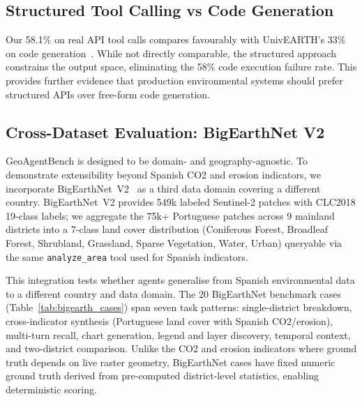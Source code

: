 \documentclass[10pt,twocolumn]{article}
\begin{document}
\subsection{Structured Tool Calling vs Code Generation}

Our 58.1\% on real API tool calls compares favourably with UnivEARTH's 33\% on code generation~\cite{kao2025univearth}. While not directly comparable, the structured approach constrains the output space, eliminating the 58\% code execution failure rate. This provides further evidence that production environmental systems should prefer structured APIs over free-form code generation.

\subsection{Cross-Dataset Evaluation: BigEarthNet V2}
\label{sec:validation}

GeoAgentBench is designed to be domain- and geography-agnostic. To demonstrate extensibility beyond Spanish CO2 and erosion indicators, we incorporate BigEarthNet~V2~\cite{clasen2024reben} as a third data domain covering a different country. BigEarthNet~V2 provides 549k labeled Sentinel-2 patches with CLC2018 19-class labels; we aggregate the 75k+ Portuguese patches across 9 mainland districts into a 7-class land cover distribution (Coniferous Forest, Broadleaf Forest, Shrubland, Grassland, Sparse Vegetation, Water, Urban) queryable via the same \texttt{analyze\_area} tool used for Spanish indicators.

This integration tests whether agents generalise from Spanish environmental data to a different country and data domain. The 20 BigEarthNet benchmark cases (Table~\ref{tab:bigearth_cases}) span seven task patterns: single-district breakdown, cross-indicator synthesis (Portuguese land cover with Spanish CO2/erosion), multi-turn recall, chart generation, legend and layer discovery, temporal context, and two-district comparison. Unlike the CO2 and erosion indicators where ground truth depends on live raster geometry, BigEarthNet cases have fixed numeric ground truth derived from pre-computed district-level statistics, enabling deterministic scoring.
\end{document}
